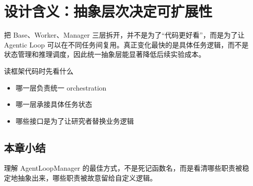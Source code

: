 \section{设计含义：抽象层次决定可扩展性}
把 Base、Worker、Manager 三层拆开，并不是为了“代码更好看”，而是为了让 Agentic Loop 可以在不同任务间复用。真正变化最快的是具体任务逻辑，而不是状态管理和推理调度，因此统一抽象层能显著降低后续实验成本。

\begin{knowledgebox}{读框架代码时先看什么}
\begin{itemize}
  \item 哪一层负责统一 orchestration
  \item 哪一层承接具体任务状态
  \item 哪些接口是为了让研究者替换业务逻辑
\end{itemize}
\end{knowledgebox}

\subsection{本章小结}
理解 AgentLoopManager 的最佳方式，不是死记函数名，而是看清哪些职责被稳定地抽象出来，哪些职责被故意留给自定义逻辑。

\newpage
